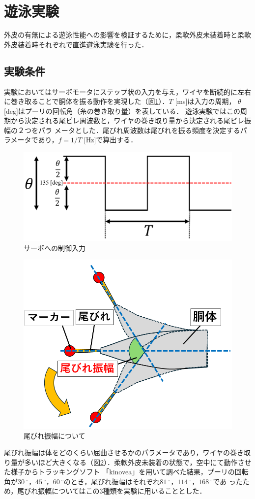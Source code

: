 \newpage
\section{遊泳実験}
外皮の有無による遊泳性能への影響を検証するために，柔軟外皮未装着時と柔軟外皮装着時それぞれで直進遊泳実験を行った．

\subsection{実験条件}
実験においてはサーボモータにステップ状の入力を与え，ワイヤを断続的に左右に巻き取ることで胴体を振る動作を実現した（図\ref{fig:servo_seigyo}）．$T$ [ms]は入力の周期，
$\theta$ [deg]はプーリの回転角（糸の巻き取り量）を表している．
遊泳実験ではこの周期から決定される尾ビレ周波数と，ワイヤの巻き取り量から決定される尾ビレ振幅の２つをパラ
メータとした．尾びれ周波数は尾びれを振る頻度を決定するパラメータであり，$f = 1/T$ [Hz]で算出する．
\begin{figure}[hb]
    \centering
    \includegraphics[width=0.8\linewidth]{chapters/picture/servo.png}
    \caption{サーボへの制御入力}
    \label{fig:servo_seigyo}
\end{figure}
\begin{figure}[hb]
    \centering
    \includegraphics[width=0.6\linewidth]{chapters/picture/obire_amp.png}
    \caption{尾びれ振幅について}
    \label{fig:obire_amp}
\end{figure}
尾びれ振幅は体をどのくらい屈曲させるかのパラメータであり，ワイヤの巻き取り量が多いほど大きくなる（図\ref{fig:obire_amp}）．柔軟外皮未装着の状態で，空中にて動作させた様子からトラッキングソフト
「kinovea」を用いて調べた結果，プーリの回転角が$30\:^\circ$，$45\:^\circ$，$60\:^\circ$のとき，尾びれ振幅はそれぞれ$81\:^\circ$，$114\:^\circ$，$168\:^\circ$であ
ったため，尾びれ振幅についてはこの3種類を実験に用いることとした． 

